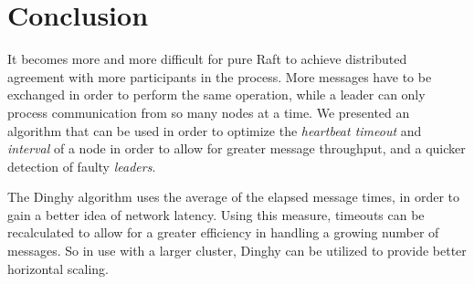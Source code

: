 \section{Conclusion}

It becomes more and more difficult for pure Raft to achieve distributed agreement with more participants in the process. More messages have to be exchanged in order to perform the same operation, while a leader can only process communication from so many nodes at a time. We presented an algorithm that can be used in order to optimize the \textit{heartbeat timeout} and \textit{interval} of a node in order to allow for greater message throughput, and a quicker detection of faulty \textit{leaders}.

The Dinghy algorithm uses the average of the elapsed message times, in order to gain a better idea of network latency. Using this measure, timeouts can be recalculated to allow for a greater efficiency in handling a growing number of messages. So in use with a larger cluster, Dinghy can be utilized to provide better horizontal scaling.